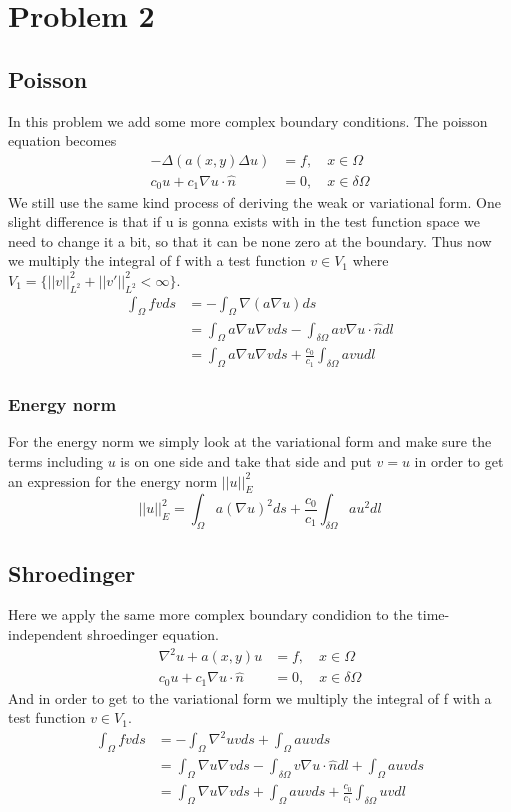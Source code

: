 \documentclass[11pt]{article}
\begin{document}
\newpage
\section{Problem 2}
\subsection{Poisson}
In this problem we add some more complex boundary conditions. The poisson equation becomes 
\begin{align}
	-\Delta(a(x,y)\Delta u) &= f, \quad x\in\Omega \\
	c_0 u + c_1 \nabla u \cdot \hat{n} &= 0, \quad x \in\delta\Omega
\end{align}
We still use the same kind process of deriving the weak or variational form. One slight difference is that if u is gonna exists with in the test function space we need to change it a bit, so that it can be none zero at the boundary. Thus now we multiply the integral of f with a test function $v\in V_1$ where $V_1 = \{||v||^2_{L^2} + ||v'||^2_{L^2} < \infty\}$.
\begin{align}
	\int_{\Omega} f v ds &= - \int_{\Omega} \nabla (a\nabla u) ds \label{eq:poisGenVar}\\
	&= \int_{\Omega} a \nabla u \nabla v ds - \int_{\delta \Omega}a v \nabla u \cdot \hat{n} dl \\
	& = \int_{\Omega} a \nabla u \nabla v ds + \frac{c_0}{c_1}  \int_{\delta \Omega} a v u dl
\end{align}

\subsubsection{Energy norm}
For the energy norm we simply look at the variational form and make sure the terms including $u$ is on one side and take that side and put $v=u$ in order to get an expression for the energy norm $||u||^2_E$
\begin{equation}
	||u||^2_E = \int_{\Omega} a (\nabla u)^2 ds + \frac{c_0}{c_1}  \int_{\delta \Omega} a u^2 dl
\end{equation}

\subsection{Shroedinger}
Here we apply the same more complex boundary condidion to the time-independent shroedinger equation. 
\begin{align}
	\nabla^2 u + a(x,y) u &= f, \quad x\in \Omega \\
	c_0 u + c_1 \nabla u \cdot \hat{n} &= 0, \quad x \in \delta \Omega
\end{align}
And in order to get to the variational form we multiply the integral of f with a test function $v\in V_1$. 
\begin{align}
	\int_{\Omega} f v d s &= - \int_{\Omega} \nabla^2 u v ds + \int_{\Omega} auv ds \\
	&= \int_{\Omega} \nabla u\nabla vds-\int_{\delta\Omega} v \nabla u \cdot \hat{n}dl + \int_{\Omega} auvds \\
	&= \int_{\Omega} \nabla u \nabla v ds + \int_{\Omega} a u v ds + \frac{c_0}{c_1}\int_{\delta \Omega} u v dl 
\end{align}
\end{document}
